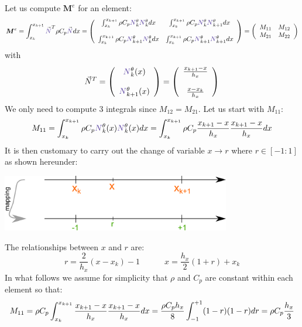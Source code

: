 Let us compute ${\bm M}^e$ for an element:
\[
{\bm M}^e
= \int_{x_k}^{x_{k+1}}   {\vec {\color{Violet}N}}^T \rho C_p {\vec {\color{Violet}N}} dx  
=
\left(
\begin{array}{cc}
\int_{x_k}^{x_{k+1}} \rho C_p {\color{Violet}N}_k^\theta {\color{Violet}N}_{k}^\theta dx   
&  \int_{x_k}^{x_{k+1}} \rho C_p {\color{Violet}N}_k^\theta {\color{Violet}N}_{k+1}^\theta dx \\ \\
\int_{x_k}^{x_{k+1}} \rho C_p {\color{Violet}N}_{k+1}^\theta {\color{Violet}N}_{k}^\theta dx  
&  \int_{x_k}^{x_{k+1}} \rho C_p {\color{Violet}N}_{k+1}^\theta {\color{Violet}N}_{k+1}^\theta dx 
\end{array}
\right)
=
\left(
\begin{array}{cc}
M_{11} & M_{12} \\
M_{21} & M_{22} 
\end{array}
\right)
\]
with 
\[
{\vec N}^T = 
\left(
\begin{array}{c}
{\color{Violet}N}_k^\theta(x)  \\ \\  {\color{Violet}N}_{k+1}^\theta(x)
\end{array}
\right)
=
\left(
\begin{array}{c}
\frac{x_{k+1}-x}{h_x}   \\ \\
\frac{x-x_k}{h_x} 
\end{array}
\right)
\]
We only need to compute 3 integrals since $M_{12}=M_{21}$.
Let us start with $M_{11}$:
\[
M_{11}=\int_{x_k}^{x_{k+1}} \rho C_p {\color{Violet}N}_k^\theta(x) {\color{Violet}N}_{k}^\theta(x) dx
=   
\int_{x_k}^{x_{k+1}} \rho C_p 
\frac{x_{k+1}-x}{h_x}  
\frac{x_{k+1}-x}{h_x}  
dx
\]
It is then customary to carry out the change of variable $x \rightarrow r$ where 
$r \in [-1:1]$ as shown hereunder:
\begin{center}
\includegraphics[width=10cm]{images/oneD/el1D_mapping}
\end{center}
The relationships between $x$ and $r$ are:
\[
r=\frac{2}{h_x}(x-x_k)-1
\quad\quad\quad
x=\frac{h_x}{2}(1+r)+x_k
\]
In what follows we assume for simplicity that $\rho$ and $C_p$ are constant within each element so that:
\[
M_{11}=
\rho C_p
\int_{\tiny x_k}^{x_{k+1}} 
\frac{x_{k+1}-x}{h_x}  
\frac{x_{k+1}-x}{h_x}  
dx
=  \frac{\rho C_p h_x}{8} \int_{-1}^{+1} (1-r) (1-r)  dr  = \rho C_p \frac{h_x}{3} 
\]
